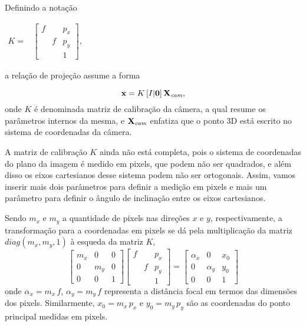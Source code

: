 Definindo a notação

\begin{center}
$
\begin{array}{cc}
K = & \begin{bmatrix}
      f& &p_x\\
       &f&p_y\\
       & &1
      \end{bmatrix}, 
\end{array}
$
\end{center}
a relação de projeção assume a forma


\begin{equation}
\mathbf{x}=K\,[I|{\bf 0}]\,\mathbf{X}_{\textit{cam}},
\end{equation}
onde $K$ é denominada matriz de calibração da câmera, a qual resume os parâmetros internos da mesma, e $\mathbf{X}_{\textit{cam}}$ enfatiza que o ponto 3D está escrito no sistema de coordenadas da câmera.

A matriz de calibração $K$ ainda não está completa, pois o sistema de coordenadas do plano da imagem é medido em pixels, que podem não ser quadrados, e além disso os eixos cartesianos desse sistema podem não ser ortogonais. Assim, vamos inserir mais dois parâmetros para definir a medição em pixels e mais um parâmetro para definir o ângulo de inclinação entre os eixos cartesianos.

Sendo $m_x$ e $m_y$ a quantidade de pixels nas direções $x$ e $y$, respectivamente, a transformação para a coordenadas em pixels se dá pela multiplicação da matriz $diag(m_x,m_y,1)$ à esqueda da matriz $K$,
\begin{equation*}
\begin{bmatrix}
m_x&0&0\\
0&m_y&0\\
0&0&1
\end{bmatrix}      
\begin{bmatrix}
f& &p_x\\
&f&p_y\\
& &1
\end{bmatrix}
=
\begin{bmatrix}
\alpha_x&0&x_0\\
0&\alpha_y&y_0\\
0&0&1
\end{bmatrix}
\end{equation*}
onde $\alpha_x=m_x\,f$, $\alpha_y=m_y\,f$ representa a distância focal em termos das dimensões dos pixels. Similarmente, $x_0=m_x\,p_x$ e $y_0=m_y\,p_y$ são as coordenadas do ponto principal medidas em pixels.

